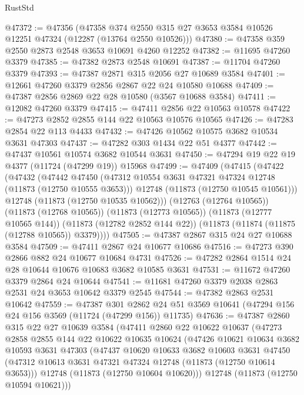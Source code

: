 \begin{lexlean}{RustStd}
\begin{coremodule}
@47372 := @47356
    (@47358 @374 @2550 @315 @27 @3653 @3584 @10526 @12251 @47324 (@12287 (@13764 @2550 @10526)))
@47380 := @47358 @359 @2550 @2873 @2548 @3653 @10691 @4260 @12252
@47382 := @11695 @47260 @3379
@47385 := @47382 @2873 @2548 @10691
@47387 := @11704 @47260 @3379
@47393 := @47387 @2871 @315 @2056 @27 @10689 @3584
@47401 := @12661 @47260 @3379 @2856 @2867 @22 @24 @10580 @10688
@47409 := @47387 @2856 @2869 @22 @28 @10580 (@3567 @10688 @3584)
@47411 := @12082 @47260 @3379
@47415 := @47411 @2856 @22 @10563 @10578
@47422 := @47273 @2852 @2855 @144 @22 @10563 @10576 @10565
@47426 := @47283 @2854 @22 @113 @4433
@47432 := @47426 @10562 @10575 @3682 @10534 @3631 @47303
@47437 := @47282 @303 @1434 @22 @51 @4377
@47442 := @47437 @10561 @10574 @3682 @10544 @3631
@47450 := @47294 @19 @22 @19 @4377 (@11724 (@47299 @19)) @15968
@47499 := @47409
    (@47415
      (@47422
        (@47432
          (@47442
            @47450
            (@47312 @10554 @3631 @47321 @47324 @12748 (@11873 (@12750 @10555 @3653)))
            @12748
            (@11873 (@12750 @10545 @10561)))
          @12748
          (@11873 (@12750 @10535 @10562)))
        (@12763 (@12764 @10565))
        (@11873 (@12768 @10565))
        (@11873 (@12773 @10565))
        (@11873 (@12777 @10565 @144))
        (@11873 (@12782 @2852 @144 @22))
        (@11873 (@11874 (@11875 (@12788 @10565)) @3379))))
@47505 := @47387 @2867 @315 @24 @27 @10688 @3584
@47509 := @47411 @2867 @24 @10677 @10686
@47516 := @47273 @390 @2866 @882 @24 @10677 @10684 @4731
@47526 := @47282 @2864 @1514 @24 @28 @10644 @10676 @10683 @3682 @10585 @3631
@47531 := @11672 @47260 @3379 @2864 @24 @10644
@47541 := @11681 @47260 @3379 @2038 @2863 @2531 @24 @3653 @10642 @3379 @2545
@47544 := @47382 @2863 @2531 @10642
@47559 := @47387
    @301
    @2862
    @24
    @51
    @3569
    @10641
    (@47294 @156 @24 @156 @3569 (@11724 (@47299 @156)) @11735)
@47636 := @47387
    @2860
    @315
    @22
    @27
    @10639
    @3584
    (@47411
      @2860
      @22
      @10622
      @10637
      (@47273
        @2858
        @2855
        @144
        @22
        @10622
        @10635
        @10624
        (@47426
          @10621
          @10634
          @3682
          @10593
          @3631
          @47303
          (@47437
            @10620
            @10633
            @3682
            @10603
            @3631
            @47450
            (@47312 @10613 @3631 @47321 @47324 @12748 (@11873 (@12750 @10614 @3653)))
            @12748
            (@11873 (@12750 @10604 @10620)))
          @12748
          (@11873 (@12750 @10594 @10621)))

\end{coremodule}
\end{lexlean}
